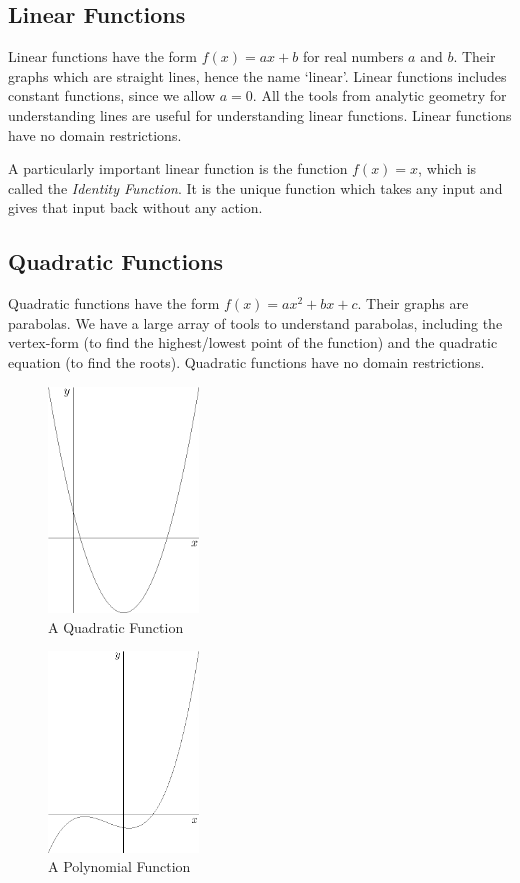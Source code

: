 \documentclass[fleqn]{report}
\begin{document}
\subsection{Linear Functions}
\label{linear-functions}

Linear functions have the form $f(x) = ax + b$ for real
numbers $a$ and $b$. Their graphs which are straight lines,
hence the name `linear'. Linear functions includes constant
functions, since we allow $a=0$. All the tools from analytic
geometry for understanding lines are useful for understanding
linear functions. Linear functions have no domain
restrictions. 

A particularly important linear function is the function $f(x)
= x$, which is called the \emph{Identity Function}. It is the
unique function which takes any input and gives that input back
without any action.

\subsection{Quadratic Functions}
\label{quadratic-functions}

Quadratic functions have the form $f(x) = ax^2 + bx + c$.
Their graphs are parabolas. We have a large array of
tools to understand parabolas, including the vertex-form (to find
the highest/lowest point of the function) and the quadratic
equation (to find the roots). Quadratic functions have no
domain restrictions.

\vspace{1cm}

\begin{figure}[t]
\centering
\includegraphics[width=4cm]{figure33.eps}
\caption{A Quadratic Function}
\label{figure-quadratic-function}
\end{figure}

\begin{figure}[t]
\centering
\includegraphics[width=4cm]{figure28.eps}
\caption{A Polynomial Function}
\label{figure-polynomial-function}
\end{figure}
\end{document}
